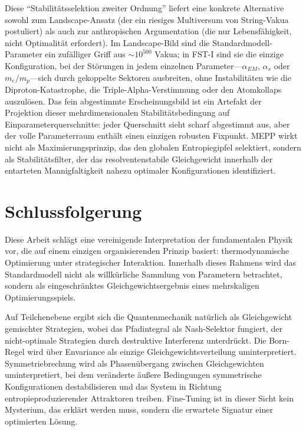 \documentclass[12pt,a4paper]{article}
\theoremstyle{remark}
\begin{document}
Diese ``Stabilit\"atsselektion zweiter Ordnung'' liefert eine konkrete Alternative sowohl zum Landscape-Ansatz (der ein riesiges Multiversum von String-Vakua postuliert) als auch zur anthropischen Argumentation (die nur Lebensfähigkeit, nicht Optimalit\"at erfordert). Im Landscape-Bild sind die Standardmodell-Parameter ein zuf\"alliger Griff aus $\sim 10^{500}$ Vakua; in FST-I sind sie die einzige Konfiguration, bei der St\"orungen in jedem einzelnen Parameter---$\alpha_{EM}$, $\alpha_s$ oder $m_e/m_p$---sich durch gekoppelte Sektoren ausbreiten, ohne Instabilit\"aten wie die Diproton-Katastrophe, die Triple-Alpha-Verstimmung oder den Atomkollaps auszul\"osen. Das fein abgestimmte Erscheinungsbild ist ein Artefakt der Projektion dieser mehrdimensionalen Stabilit\"atsbedingung auf Einparameterquerschnitte: jeder Querschnitt sieht scharf abgestimmt aus, aber der volle Parameterraum enth\"alt einen einzigen robusten Fixpunkt. MEPP wirkt nicht als Maximierungsprinzip, das den globalen Entropiegipfel selektiert, sondern als Stabilit\"atsfilter, der das resolventenstabile Gleichgewicht innerhalb der entarteten Mannigfaltigkeit nahezu optimaler Konfigurationen identifiziert.

\section{Schlussfolgerung}
\label{sec:conclusion}

Diese Arbeit schl\"agt eine vereinigende Interpretation der fundamentalen Physik vor, die auf einem einzigen organisierenden Prinzip basiert: thermodynamische Optimierung unter strategischer Interaktion. Innerhalb dieses Rahmens wird das Standardmodell nicht als willk\"urliche Sammlung von Parametern betrachtet, sondern als eingeschr\"anktes Gleichgewichtsergebnis eines mehrskaligen Optimierungsspiels.

Auf Teilchenebene ergibt sich die Quantenmechanik nat\"urlich als Gleichgewicht gemischter Strategien, wobei das Pfadintegral als Nash-Selektor fungiert, der nicht-optimale Strategien durch destruktive Interferenz unterdr\"uckt. Die Born-Regel wird \"uber Envariance als einzige Gleichgewichtsverteilung uminterpretiert. Symmetriebrechung wird als Phasen\"ubergang zwischen Gleichgewichten uminterpretiert, bei dem ver\"anderte \"au\ss{}ere Bedingungen symmetrische Konfigurationen destabilisieren und das System in Richtung entropieproduzierender Attraktoren treiben. Fine-Tuning ist in dieser Sicht kein Mysterium, das erkl\"art werden muss, sondern die erwartete Signatur einer optimierten L\"osung.
\end{document}

